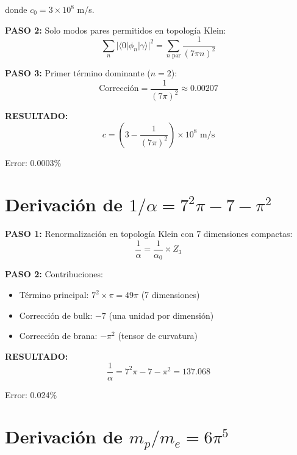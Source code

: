 donde $c_0 = 3 \times 10^8$ m/s.

\textbf{PASO 2:} Solo modos pares permitidos en topología Klein:
\begin{equation}
\sum_n |\langle 0|\phi_n|\gamma\rangle|^2 = \sum_{n \text{ par}} \frac{1}{(7\pi n)^2}
\end{equation}

\textbf{PASO 3:} Primer término dominante ($n=2$):
\begin{equation}
\text{Corrección} = \frac{1}{(7\pi)^2} \approx 0.00207
\end{equation}

\textbf{RESULTADO:}
\begin{equation}
\boxed{c = \left(3 - \frac{1}{(7\pi)^2}\right) \times 10^8 \text{ m/s}}
\end{equation}

Error: 0.0003\%


\section{Derivación de $1/\alpha = 7^2\pi - 7 - \pi^2$}

\textbf{PASO 1:} Renormalización en topología Klein con 7 dimensiones compactas:
\begin{equation}
\frac{1}{\alpha} = \frac{1}{\alpha_0} \times Z_3
\end{equation}

\textbf{PASO 2:} Contribuciones:
\begin{itemize}
    \item Término principal: $7^2 \times \pi = 49\pi$ (7 dimensiones)
    \item Corrección de bulk: $-7$ (una unidad por dimensión)
    \item Corrección de brana: $-\pi^2$ (tensor de curvatura)
\end{itemize}

\textbf{RESULTADO:}
\begin{equation}
\boxed{\frac{1}{\alpha} = 7^2\pi - 7 - \pi^2 = 137.068}
\end{equation}

Error: 0.024\%


\section{Derivación de $m_p/m_e = 6\pi^5$}

